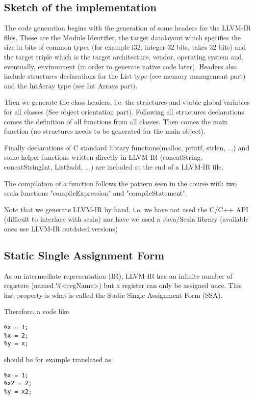 \subsection{Sketch of the implementation}
The code generation begins with the generation of some headers for the LLVM-IR files. These are the Module Identifier, the target datalayout which specifies the size in bits of common types (for example i32, integer 32 bits, takes 32 bits) and the target triple which is the target architecture, vendor, operating system and, eventually, environment (in order to generate native code later). Headers also include structures declarations for the List type (see memory management part) and the IntArray type (see Int Arrays part).

Then we generate the class headers, i.e. the structures and vtable global variables for all classes (See object orientation part). Following all structures declarations comes the definition of all functions from all classes. Then comes the main function (no structures needs to be generated for the main object).

Finally declarations of C standard library functions(malloc, printf, strlen, ...) and some helper functions written directly in LLVM-IR (concatString, concatStringInt, List\$add, ...) are included at the end of a LLVM-IR file.

The compilation of a function follows the pattern seen in the course with two scala functions "compileExpression" and "compileStatement".

Note that we generate LLVM-IR by hand, i.e. we have not used the C/C++ API (difficult to interface with scala) nor have we used a Java/Scala library (available ones use LLVM-IR outdated versions)

\subsection{Static Single Assignment Form}
As an intermediate representation (IR), LLVM-IR has an infinite number of registers (named \%\textless regName\textgreater ) but a register can only be assigned once. This last property is what is called the Static Single Assignment Form (SSA).

Therefore, a code like
\begin{lstlisting}
%x = 1;
%x = 2;
%y = x;
\end{lstlisting}

should be for example translated as
\begin{lstlisting}
%x = 1;
%x2 = 2;
%y = x2;
\end{lstlisting}

